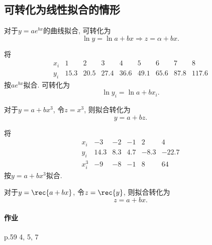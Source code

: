 \documentclass[hidelinks]{ctexart}
\begin{document}

\subsection{可转化为线性拟合的情形} %
\label{sub:可转化为线性拟合的情形}

对于$y=ae^{bx}$的曲线拟合, 可转化为
\[ \ln y = \ln a + bx \Rightarrow z = \alpha + bx. \]
\begin{ex}
    将
    \[ \begin{array}{lllllllll}
        x_i & 1 & 2 & 3 & 4 & 5 & 6 & 7 & 8 \\
        y_i & 15.3 & 20.5 & 27.4 & 36.6 & 49.1 & 65.6 & 87.8 & 117.6
    \end{array} \]
    按$ae^{bx}$拟合. 可转化为
    \[ \ln y_i = \ln a + bx_i. \]
\end{ex}
对于$y=a+bx^3$, 令$z = x^3$, 则拟合转化为
\[ y = a+bz. \]
\begin{ex}
    将
    \[ \begin{array}{llllll}
        x_i & -3 & -2 & -1 & 2 & 4 \\
        y_i & 14.3 & 8.3 & 4.7 & -8.3 & -22.7 \\
        x_i^3 & -9 & -8 & -1 & 8 & 64
    \end{array} \]
    按$y = a+bx^3$拟合.
\end{ex}
对于$\displaystyle y = \rec{a+bx}$, 令$\displaystyle z = \rec{y}$, 则拟合转化为
\[ z = a+bx. \]

\paragraph{作业} %
\label{par:作业}

p.59 4, 5, 7



\end{document}
